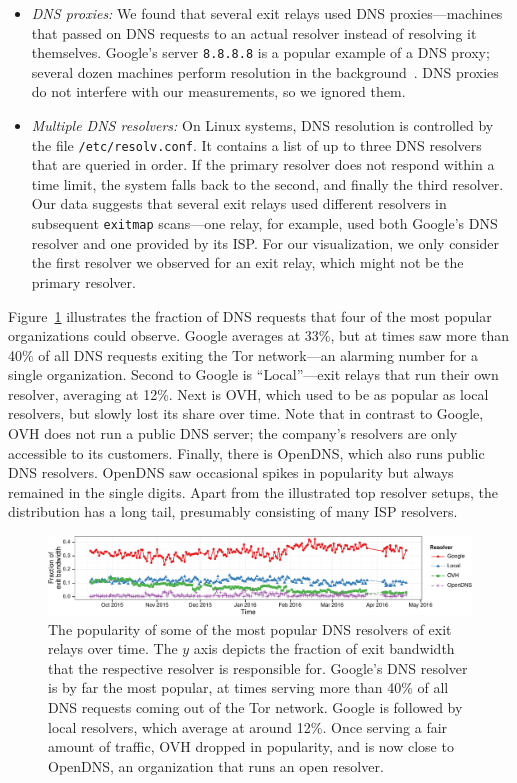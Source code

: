 \begin{itemize}
\item {\em DNS proxies:}
We found that several exit relays used DNS
proxies---machines that passed on DNS requests to an actual resolver
instead of resolving it themselves.  Google's server {\tt 8.8.8.8} is a popular
example of a DNS proxy;
several dozen machines perform resolution in the
background~\cite{google-proxies}.  DNS proxies do
not interfere with our measurements, so we ignored them.

\item {\em Multiple DNS resolvers:}
On Linux systems, DNS resolution is controlled by the file
\texttt{/etc/resolv.conf}.  It contains a list of up to three DNS resolvers
that are queried in order.  If the primary resolver does not respond within a
time limit, the system falls back to the second, and finally the third
resolver.  Our data suggests that several exit relays used
different resolvers in subsequent {\tt exitmap} scans---one relay, for example,
used both Google's DNS resolver and one provided by its ISP.  For our
visualization, we only consider the first resolver we observed for an exit
relay, which might not be the primary resolver.
\end{itemize}
\noindent
Figure~\ref{fig:exit-resolvers} illustrates the fraction of DNS requests that
four of the most popular organizations could observe.  Google averages at 33\%,
but at times saw more than 40\% of all DNS requests exiting the Tor network---an
alarming number for a single organization.  Second to Google is ``Local''---exit
relays that run their own resolver, averaging at 12\%.  Next is OVH, which used
to be as popular as local resolvers, but slowly lost its share over time.  Note
that in contrast to Google, OVH does not run a public DNS server; the company's
resolvers are only accessible to its customers.  Finally, there is OpenDNS,
which also runs public DNS resolvers.  OpenDNS saw occasional spikes in
popularity but always remained in the single digits.  Apart from the illustrated
top resolver setups, the distribution has a long tail, presumably consisting of
many ISP resolvers.

\begin{figure}[t]
	\centering
	\includegraphics[width=\linewidth]{figures/asn-bw-frac.pdf}
	\caption{The popularity of some of the most popular DNS resolvers of exit
		relays over time.  The $y$ axis depicts the fraction of exit bandwidth
		that the respective resolver is responsible for.  Google's DNS resolver
		is by far the most popular, at times serving more than 40\% of all DNS
		requests coming out of the Tor network.  Google is followed by local
		resolvers, which average at around 12\%.  Once serving a fair amount of
		traffic, OVH dropped in popularity, and is now close to OpenDNS, an
		organization that runs an open resolver.}
	\label{fig:exit-resolvers}
\end{figure}

